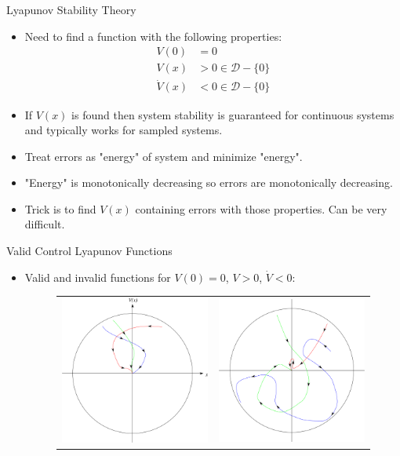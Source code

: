 \documentclass[hyperref={pdfpagelabels=false}]{beamer}
\begin{document}
\begin{frame}{Lyapunov Stability Theory}
\begin{itemize}
\item Need to find a function with the following properties:
\begin{align*}
V(0) &= 0 \\
V(x) &> 0 \in \mathcal{D}-\{0\} \\
\dot{V}(x) &< 0 \in \mathcal{D}-\{0\}
\end{align*}
\item If $V(x)$ is found then system stability is guaranteed for continuous systems and typically works for sampled systems.
\item Treat errors as "energy" of system and minimize "energy".
\item "Energy" is monotonically decreasing so errors are monotonically decreasing.
\item Trick is to find $V(x)$ containing errors with those properties. Can be very difficult.
\end{itemize}
\end{frame}

\begin{frame}{Valid Control Lyapunov Functions}
\begin{itemize}
\item Valid and invalid functions for $V(0)=0$, $V>0$, $\dot{V}<0$:
\begin{figure}[ht!]
    \centering
    \begin{tabular}{c c}
    \includegraphics[width=.45\textwidth]{images/Vstable} &
    \includegraphics[width=.45\textwidth]{images/Vunstable}
    \end{tabular}
\end{figure}
\end{itemize}
\end{frame}
\end{document}
